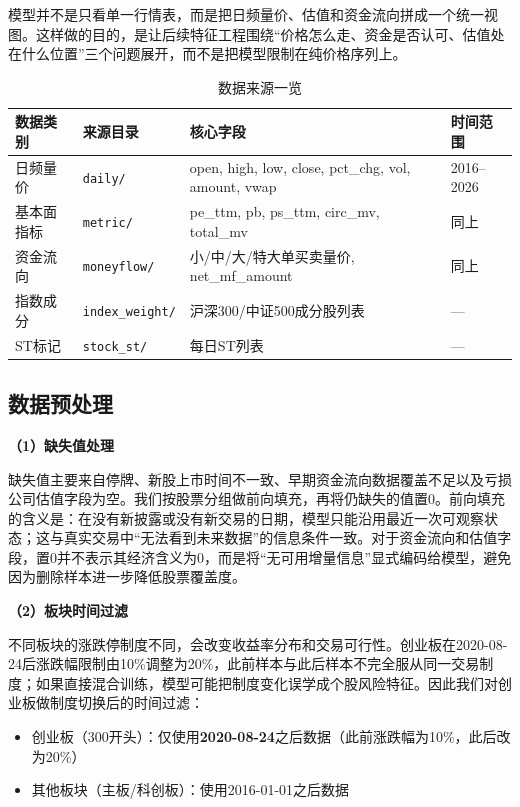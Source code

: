 \documentclass[10pt,a4paper]{ctexart}
\begin{document}
模型并不是只看单一行情表，而是把日频量价、估值和资金流向拼成一个统一视图。这样做的目的，是让后续特征工程围绕“价格怎么走、资金是否认可、估值处在什么位置”三个问题展开，而不是把模型限制在纯价格序列上。

\begin{table}[htbp]
    \centering
    \caption{数据来源一览}
    \footnotesize
    \begin{tabular}{p{2.3cm}p{2.6cm}p{6.8cm}p{2.0cm}}
        \toprule
        数据类别 & 来源目录 & 核心字段 & 时间范围 \\
        \midrule
        日频量价 & \texttt{daily/} & open, high, low, close, pct\_chg, vol, amount, vwap & 2016--2026 \\
        基本面指标 & \texttt{metric/} & pe\_ttm, pb, ps\_ttm, circ\_mv, total\_mv & 同上 \\
        资金流向 & \texttt{moneyflow/} & 小/中/大/特大单买卖量价, net\_mf\_amount & 同上 \\
        指数成分 & \texttt{index\_weight/} & 沪深300/中证500成分股列表 & --- \\
        ST标记 & \texttt{stock\_st/} & 每日ST列表 & --- \\
        \bottomrule
    \end{tabular}
\end{table}

\subsection{数据预处理}

\textbf{（1）缺失值处理}

缺失值主要来自停牌、新股上市时间不一致、早期资金流向数据覆盖不足以及亏损公司估值字段为空。我们按股票分组做前向填充，再将仍缺失的值置0。前向填充的含义是：在没有新披露或没有新交易的日期，模型只能沿用最近一次可观察状态；这与真实交易中“无法看到未来数据”的信息条件一致。对于资金流向和估值字段，置0并不表示其经济含义为0，而是将“无可用增量信息”显式编码给模型，避免因为删除样本进一步降低股票覆盖度。

\textbf{（2）板块时间过滤}

不同板块的涨跌停制度不同，会改变收益率分布和交易可行性。创业板在2020-08-24后涨跌幅限制由10\%调整为20\%，此前样本与此后样本不完全服从同一交易制度；如果直接混合训练，模型可能把制度变化误学成个股风险特征。因此我们对创业板做制度切换后的时间过滤：
\begin{itemize}
    \item 创业板（300开头）：仅使用\textbf{2020-08-24}之后数据（此前涨跌幅为10\%，此后改为20\%）
    \item 其他板块（主板/科创板）：使用2016-01-01之后数据
\end{itemize}
\end{document}
